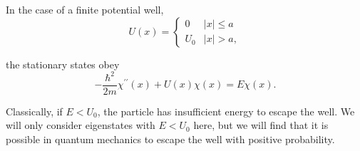 \documentclass[a4paper,11pt]{article}
\begin{document}
\begin{example}
    In the case of a finite potential well,
    \[
    U(x)= \begin{cases}0 & |x| \leq a \\ U_0 & |x|>a,\end{cases}
    \]
    \begin{center}
    \end{center}
    the stationary states obey
    \[
    -\frac{\hbar^2}{2 m} \chi^{\prime \prime}(x)+U(x) \chi(x)=E \chi(x) .
    \]
\end{example}

Classically, if \( E < U_0 \), the particle has insufficient energy to escape the well.
We will only consider eigenstates with \( E < U_0 \) here, but we will find that it is possible in quantum mechanics to escape the well with positive probability.
\end{document}
